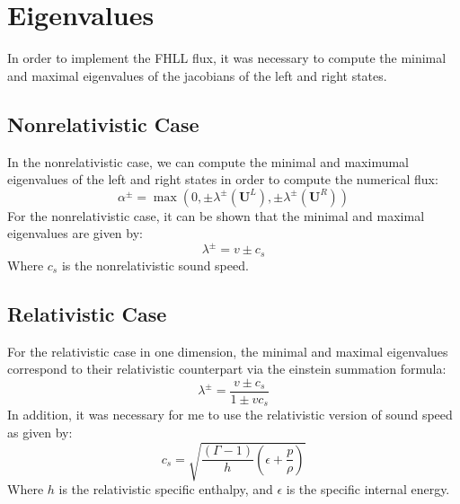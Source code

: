 \section{Eigenvalues}
In order to implement the FHLL flux, it was necessary to compute the minimal and maximal eigenvalues of the jacobians of the left and right states. 
\subsection{Nonrelativistic Case}
In the nonrelativistic case, we can compute the minimal and maximumal eigenvalues of the left and right states in order to compute the numerical flux:
$$\alpha^{\pm}=\max(0,\pm\lambda^{\pm}(\bm{U}^L),\pm\lambda^{\pm}(\bm{U}^R))$$
For the nonrelativistic case, it can be shown that the minimal and maximal eigenvalues are given by:
$$\lambda^{\pm}=v\pm c_s$$
Where $c_s$ is the nonrelativistic sound speed. 
\subsection{Relativistic Case}
For the relativistic case in one dimension, the minimal and maximal eigenvalues correspond to their relativistic counterpart via the einstein summation formula:
$$\lambda^{\pm}=\frac{v\pm c_s}{1\pm v c_s}$$
In addition, it was necessary for me to use the relativistic version of sound speed as given by:
$$c_s=\sqrt{\frac{(\Gamma-1)}{h}\left(\epsilon+\frac{p}{\rho}\right)}$$
Where $h$ is the relativistic specific enthalpy, and $\epsilon$ is the specific internal energy. 
